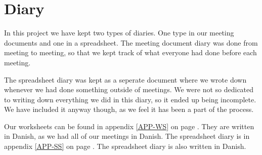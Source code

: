\chapter{Diary}
In this project we have kept two types of diaries. One type in our meeting
documents and one in a spreadsheet. The meeting document diary was done from
meeting to meeting, so that we kept track of what everyone had done before each
meeting.

The spreadsheet diary was kept as a seperate document where we wrote down
whenever we had done something outside of meetings. We were not so dedicated to
writing down everything we did in this diary, so it ended up being incomplete.
We have included it anyway though, as we feel it has been a part of the process.

Our worksheets can be found in appendix \ref{APP-WS} on page \pageref{APP-WS}.
They are written in Danish, as we had all of our meetings in Danish. The spreadsheet
diary is in appendix \ref{APP-SS}  on page
\pageref{APP-SS}. The spreadsheet diary is also written in Danish.